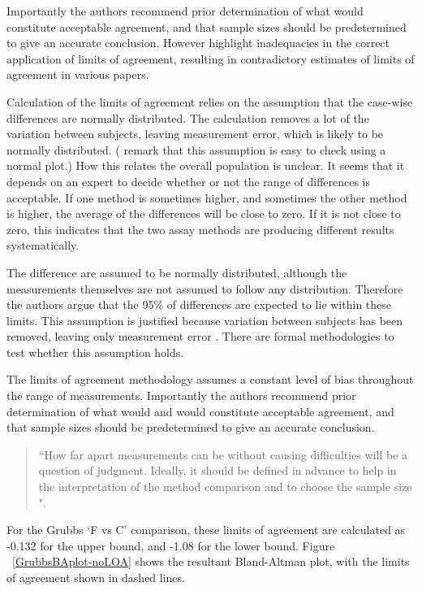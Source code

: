\documentclass[12pt, a4paper]{report}
\theoremstyle{plain}
\theoremstyle{definition}
\theoremstyle{remark}
\begin{document}
Importantly the authors recommend prior determination of what would constitute acceptable
agreement, and that sample sizes should be predetermined to give an accurate conclusion. However \citet{mantha} highlight inadequacies in the correct application of limits of agreement, resulting in contradictory estimates of limits of agreement in various papers.

Calculation of the limits of agreement relies on the assumption that the case-wise differences are normally distributed.
The calculation removes a lot of the variation between subjects,  leaving measurement error, which is likely to be normally distributed. (\citet{BA99} remark that this assumption is easy to check using a normal plot.) 
	How this relates the overall population is unclear. It seems that it depends on an expert to decide whether or not the range of
	differences is acceptable. 
	If one method is sometimes higher, and sometimes the other method is higher, the average of the differences will be close to zero.
	If it is not close to zero, this indicates that the two assay methods are producing different results systematically.
	
The difference are assumed to be normally distributed, although the measurements themselves are not assumed to follow any distribution. Therefore the authors argue that the 95\% of differences are expected to lie within these limits. This assumption is justified because variation between subjects has been removed, leaving only measurement error \citep{BA86}. There are formal methodologies to test whether this assumption holds.

The limits of agreement methodology assumes a constant level of bias throughout the range of measurements. Importantly the authors recommend prior determination of what would and would constitute acceptable
agreement, and that sample sizes should be predetermined to give an accurate conclusion. 

\begin{quote}
	``How far apart measurements can be without causing difficulties
	will be a question of judgment. Ideally, it should be defined in
	advance to help in the interpretation of the method comparison and
	to choose the sample size \citep{BA86}".
\end{quote}

For the Grubbs `F vs C' comparison, these limits
of agreement are calculated as -0.132 for the upper bound, and
-1.08 for the lower bound. Figure ~\ref{GrubbsBAplot-noLOA} shows the resultant
Bland-Altman plot, with the limits of agreement shown in dashed
lines.
\end{document}
